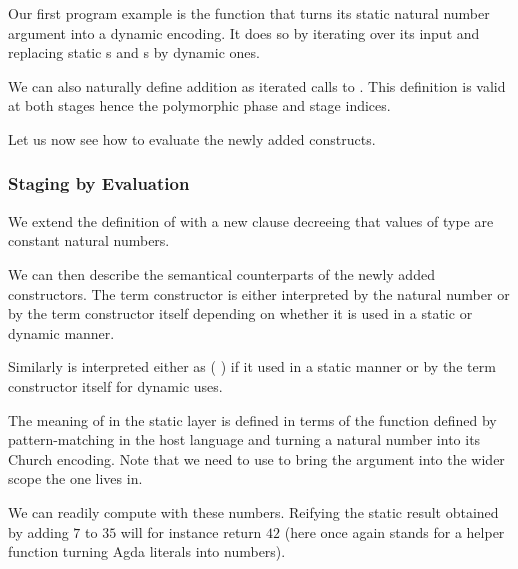 Our first program example is the function  that
turns its static natural number argument into a dynamic
encoding. It does so by iterating over its input and replacing
static s and s by dynamic ones.


We can also naturally define addition as iterated calls to
. This definition is valid at both stages hence
the polymorphic phase and stage indices.

\label{def:add}

Let us now see how to evaluate the newly added constructs.

\subsubsection{Staging by Evaluation}

We extend the definition of  with a new clause decreeing
that values of type  are constant natural numbers.


We can then describe the semantical counterparts of the newly
added constructors.
%
The term constructor  is either interpreted by
the natural number  or by the term constructor itself
depending on whether it is used in a static or dynamic manner.


Similarly  is interpreted either as ( \AF{+}\AS{\_})
if it used in a static manner or by the term constructor itself
for dynamic uses.


The meaning of  in the static layer is defined in
terms of the  function defined by pattern-matching
in the host language and turning a natural number into its
Church encoding. Note that we need to use  to
bring the  argument into the wider scope the 
one lives in.



We can readily compute with these numbers. Reifying the static
result obtained by adding $7$ to $35$ will for instance return
$42$ (here  once again stands for a helper function
turning Agda literals into  numbers).


